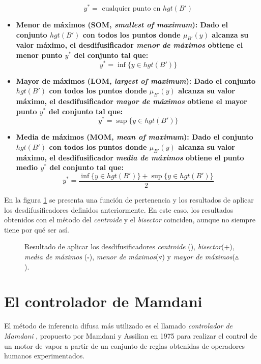 \begin{itemize}
  \begin{equation}
	y^* = \text{ cualquier punto en } hgt(B')
  \end{equation}
  \item\bfseries Menor de máximos (SOM, \emph{smallest of maximum}): \normalfont Dado el conjunto $hgt(B')$ con todos los puntos donde $\mu_{B'}(y)$ alcanza su valor máximo, el desdifusificador \emph{menor de máximos} obtiene el menor punto $y^*$ del conjunto tal que:
  \begin{equation}
	y^* = \inf\{y \in hgt(B')\}
  \end{equation}
  \item\bfseries Mayor de máximos (LOM, \emph{largest of maximum}): \normalfont Dado el conjunto $hgt(B')$ con todos los puntos donde $\mu_{B'}(y)$ alcanza su valor máximo, el desdifusificador \emph{mayor de máximos} obtiene el mayor punto $y^*$ del conjunto tal que:
   \begin{equation}
  	y^* = \sup\{y \in hgt(B')\}
    \end{equation}
   \item\bfseries Media de máximos (MOM, \emph{mean of maximum}): \normalfont Dado el conjunto $hgt(B')$ con todos los puntos donde $\mu_{B'}(y)$ alcanza su valor máximo, el desdifusificador \emph{media de máximos} obtiene el punto medio $y^*$ del conjunto tal que:
   \begin{equation}
     	y^* = \frac{ \inf\{y \in hgt(B')\} + \sup\{y \in hgt(B')\}}{2}
   \end{equation}
\end{itemize}
En la figura \ref{fig:defuzzifiers} se presenta una función de pertenencia y los resultados de aplicar los desdifusificadores definidos anteriormente. En este caso, los resultados obtenidos con el método del \emph{centroide} y el \emph{bisector} coinciden, aunque no siempre tiene por qué ser así.
\begin{figure}[t]
	\centering
	\setlength\figureheight{5.5cm}
	\setlength\figurewidth{12cm}
	
	\caption{Resultado de aplicar los desdifusificadores \emph{centroide} (\textasteriskcentered), \emph{bisector}(+), \emph{media de máximos} ($\square$), \emph{menor de máximos}($\triangledown$) y \emph{mayor de máximos}($\vartriangle$).}
	\label{fig:defuzzifiers}
\end{figure}

\section{El controlador de Mamdani}
El método de inferencia difusa más utilizado es el llamado \emph{controlador de Mamdani} \cite{Mamdani1975}, propuesto por Mamdani y Assilian en 1975 para realizar el control de un motor de vapor a partir de un conjunto de reglas obtenidas de operadores humanos experimentados.
